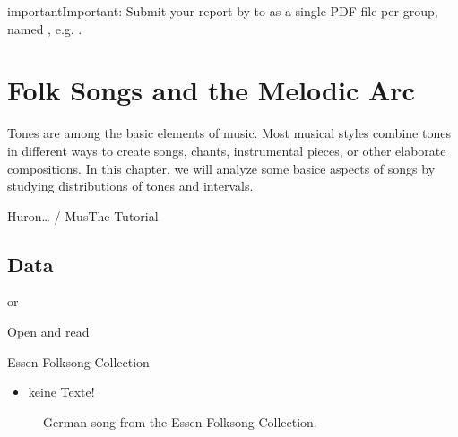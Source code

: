 \documentclass[letterpaper,10pt,english]{sphinxmanual}
\begin{document}
\begin{sphinxadmonition}{important}{Important:}
Submit your report by  to 
as a single PDF file per group, named , e.g. .
\end{sphinxadmonition}


\chapter{Folk Songs and the Melodic Arc}
\label{\detokenize{3_folk_songs:folk-songs-and-the-melodic-arc}}\label{\detokenize{3_folk_songs::doc}}

\clearpage

Tones are among the basic elements of music. Most musical styles combine tones in different ways
to create songs, chants, instrumental pieces, or other elaborate compositions.
In this chapter, we will analyze some basice aspects of songs by studying distributions of tones and intervals.

Huron… / MusThe Tutorial


\section{Data}
\label{\detokenize{3_folk_songs:data}}
or 

Open and read 

Essen Folksong Collection
\begin{itemize}
\item {} 
keine Texte!

\end{itemize}

\begin{figure}[htbp]
\centering
\capstart

\noindent{}
\caption{German song  from the Essen Folksong Collection.}\label{\detokenize{3_folk_songs:id3}}\end{figure}
\end{document}
